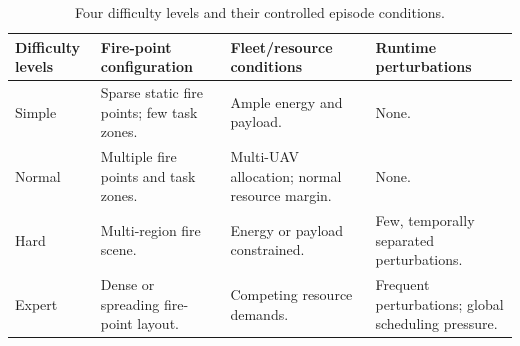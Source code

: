 \begin{table}[!t]
    \centering
    \caption{Four difficulty levels and their controlled episode conditions.}
    \label{tab:scenario-controls}
    \footnotesize
    \setlength{\tabcolsep}{4.5pt}
    \renewcommand{\arraystretch}{1.2}
    \begin{tabularx}{\textwidth}{
        @{}
        >{\raggedright\arraybackslash}p{3cm}
        >{\raggedright\arraybackslash}p{3.5cm}
        >{\raggedright\arraybackslash}p{4cm}
        >{\raggedright\arraybackslash}X
        @{}
    }
        \toprule
        \textbf{Difficulty levels} &
        \textbf{Fire-point configuration} &
        \textbf{Fleet/resource conditions} &
        \textbf{Runtime perturbations} \\
        \midrule
        Simple &
        Sparse static fire points; few task zones. &
        Ample energy and payload. &
        None. \\

        Normal &
        Multiple fire points and task zones. &
        Multi-UAV allocation; normal resource margin. &
        None. \\

        Hard &
        Multi-region fire scene. &
        Energy or payload constrained. &
        Few, temporally separated perturbations. \\

        Expert &
        Dense or spreading fire-point layout. &
        Competing resource demands. &
        Frequent perturbations; global scheduling pressure. \\
        \bottomrule
    \end{tabularx}
\end{table}
